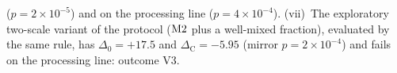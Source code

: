 ($p=2\times10^{-5}$) and on the processing line ($p=4\times10^{-4}$).
(vii)~The exploratory two-scale variant of the protocol ($\mathrm{M2}$ plus a well-mixed fraction), evaluated by the
same rule, has $\Delta_0=+17.5$ and $\Delta_{\mathrm{C}}=-5.95$ (mirror $p=2\times10^{-4}$) and fails on the
processing line: outcome V3.

